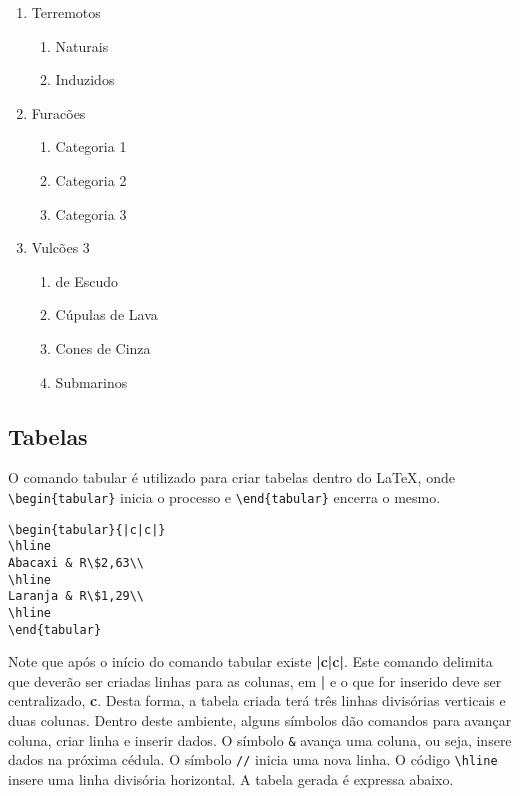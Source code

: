 \begin{enumerate}
    \item Terremotos
    \begin{enumerate}
        \item Naturais
        \item Induzidos
    \end{enumerate}
    \item Furacões
    \begin{enumerate}
        \item Categoria 1
        \item Categoria 2
        \item Categoria 3
    \end{enumerate}
    \item Vulcões 3
    \begin{enumerate}
        \item de Escudo
        \item Cúpulas de Lava
        \item Cones de Cinza
        \item Submarinos
    \end{enumerate}
\end{enumerate}

\subsection{Tabelas}
O comando tabular é utilizado para criar tabelas dentro do LaTeX, onde \verb|\begin{tabular}| inicia o processo e \verb|\end{tabular}| encerra o mesmo.

\begin{verbatim}
\begin{tabular}{|c|c|}
\hline
Abacaxi & R\$2,63\\
\hline
Laranja & R\$1,29\\
\hline
\end{tabular}
\end{verbatim}

Note que após o início do comando tabular existe \textbf{{|c|c|}}. Este comando delimita que deverão ser criadas linhas para as colunas, em \textbf{|} e o que for inserido deve ser centralizado, \textbf{c}. Desta forma, a tabela criada terá três linhas divisórias verticais e duas colunas.
Dentro deste ambiente, alguns símbolos dão comandos para avançar coluna, criar linha e inserir dados.
O símbolo \verb|&| avança uma coluna, ou seja, insere dados na próxima cédula.
O símbolo \verb|//| inicia uma nova linha.
O código \verb|\hline| insere uma linha divisória horizontal.
A tabela gerada é expressa abaixo.

